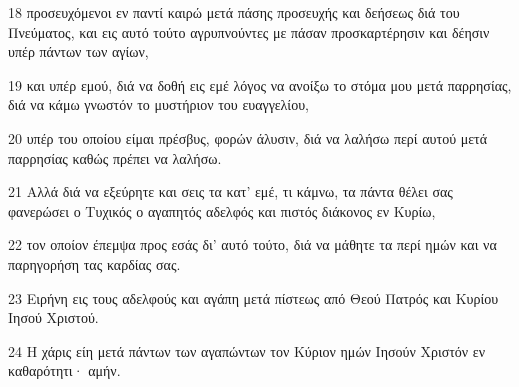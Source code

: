 \par 18 προσευχόμενοι εν παντί καιρώ μετά πάσης προσευχής και δεήσεως διά του Πνεύματος, και εις αυτό τούτο αγρυπνούντες με πάσαν προσκαρτέρησιν και δέησιν υπέρ πάντων των αγίων,
\par 19 και υπέρ εμού, διά να δοθή εις εμέ λόγος να ανοίξω το στόμα μου μετά παρρησίας, διά να κάμω γνωστόν το μυστήριον του ευαγγελίου,
\par 20 υπέρ του οποίου είμαι πρέσβυς, φορών άλυσιν, διά να λαλήσω περί αυτού μετά παρρησίας καθώς πρέπει να λαλήσω.
\par 21 Αλλά διά να εξεύρητε και σεις τα κατ' εμέ, τι κάμνω, τα πάντα θέλει σας φανερώσει ο Τυχικός ο αγαπητός αδελφός και πιστός διάκονος εν Κυρίω,
\par 22 τον οποίον έπεμψα προς εσάς δι' αυτό τούτο, διά να μάθητε τα περί ημών και να παρηγορήση τας καρδίας σας.
\par 23 Ειρήνη εις τους αδελφούς και αγάπη μετά πίστεως από Θεού Πατρός και Κυρίου Ιησού Χριστού.
\par 24 Η χάρις είη μετά πάντων των αγαπώντων τον Κύριον ημών Ιησούν Χριστόν εν καθαρότητι· αμήν.


